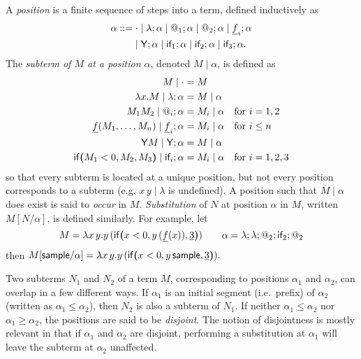 A \emph{position} is a finite sequence of steps into a term, defined inductively as
\begin{align*}
\alpha ::= & \; {\cdot} \mid \lambda ; \alpha \mid @_1 ; \alpha \mid @_2 ; \alpha \mid \underline f_i ; \alpha \\
& {} \mid \mathsf{Y} ; \alpha \mid \textsf{if}_1 ; \alpha \mid \textsf{if}_2 ; \alpha \mid \textsf{if}_3 ; \alpha.
\end{align*}
The \emph{subterm of $M$ at a position $\alpha$}, denoted $M \mid \alpha$, is defined as
\begin{align*}
M \mid \cdot & = M \\
\lambda x. M \mid \lambda ; \alpha & = M \mid \alpha \\
M_1 M_2 \mid @_i ; \alpha & = M_i \mid \alpha \quad \text{for } i = 1,2 \\
\underline f(M_1,\dots,M_n) \mid \underline f_i ; \alpha & = M_i \mid \alpha \quad \text{for }i \leq n \\
\mathsf{Y} M \mid \mathsf{Y} ; \alpha & = M \mid \alpha \\
\mathsf{if}\boldsymbol{(}M_1 < 0, M_2, M_3\boldsymbol{)} \mid \textsf{if}_i ; \alpha & = M_i \mid \alpha \quad \text{for } i = 1,2,3
\end{align*}
so that every subterm is located at a unique position, but not every position corresponds to a subterm (e.g. $x \, y \mid \lambda$ is undefined). 
A position such that $M\mid \alpha$ does exist is said to \emph{occur} in $M$. 
\emph{Substitution} of $N$ at position $\alpha$ in $M$, written $M[N/\alpha]$, is defined similarly.
For example, let 
\[
M = \lambda x \, y. y \, (\mathsf{if}\boldsymbol{(}x < 0, y \, (\underline f (x)), \underline 3\boldsymbol{)})
\qquad
\alpha =\lambda ; \lambda ; @_2 ; \textsf{if}_2 ; @_2
\]
then 
\(
M[\mathsf{sample} / \alpha] = \lambda x \, y. y \, (\mathsf{if}\boldsymbol{(}x < 0, y \, \mathsf{sample}, \underline 3\boldsymbol{)}).
\)

Two subterms $N_1$ and $N_2$ of a term $M$, corresponding to positions $\alpha_1$ and $\alpha_2$, can overlap in a few different ways. 
If $\alpha_1$ is an initial segment (i.e.~prefix) of $\alpha_2$ (written as $\alpha_1 \leq \alpha_2$), then $N_2$ is also a subterm of $N_1$. If neither $\alpha_1 \leq \alpha_2$ nor $\alpha_1 \geq \alpha_2$, the positions are said to be \emph{disjoint}. 
The notion of disjointness is mostly relevant in that if $\alpha_1$ and $\alpha_2$ are disjoint, performing a substitution at $\alpha_1$ will leave the subterm at $\alpha_2$ unaffected.

